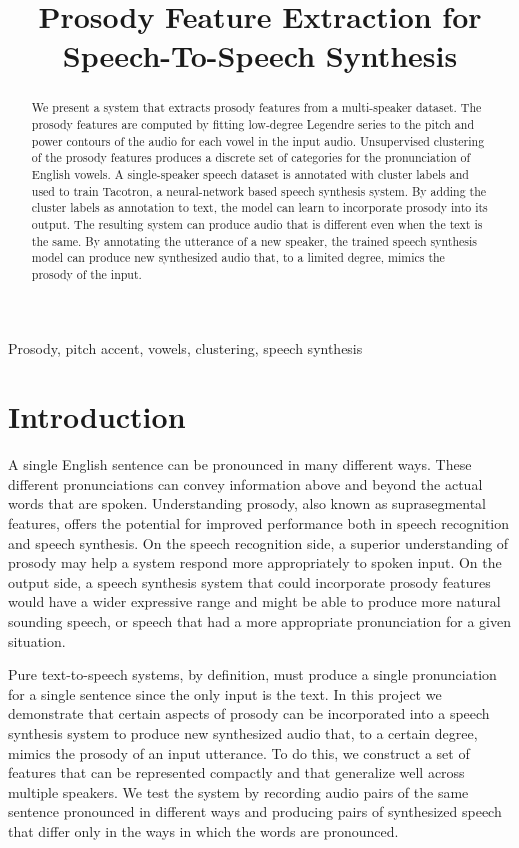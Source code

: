 \documentclass{article}
\title{Prosody Feature Extraction for Speech-To-Speech Synthesis}
\begin{document}
%
\maketitle
%
\begin{abstract}
We present a system that extracts prosody features from a multi-speaker dataset.
The prosody features are computed by fitting low-degree Legendre series to the pitch and power contours of the audio for each vowel in the input audio.
Unsupervised clustering of the prosody features produces a discrete set of categories for the pronunciation of English vowels. A single-speaker speech dataset is annotated with cluster labels and used to train Tacotron, a neural-network based speech synthesis system.
By adding the cluster labels as annotation to text, the model can learn to incorporate prosody into its output.
The resulting system can produce audio that is different even when the text is the same.
By annotating the utterance of a new speaker, the trained speech synthesis model can produce new synthesized audio that, to a limited degree, mimics the prosody of the input.
\end{abstract}
%
\begin{keywords}
Prosody, pitch accent, vowels, clustering, speech synthesis
\end{keywords}
%
\section{Introduction}
\label{sec:intro}

A single English sentence can be pronounced in many different ways.
These different pronunciations can convey information above and beyond the actual words that are spoken.
Understanding prosody, also known as suprasegmental features, offers the potential for improved performance both in speech recognition and speech synthesis.
On the speech recognition side, a superior understanding of prosody may help a system respond more appropriately to spoken input.
On the output side, a speech synthesis system that could incorporate prosody features would have a wider expressive range and might be able to produce more natural sounding speech, or speech that had a more appropriate pronunciation for a given situation.

Pure text-to-speech systems, by definition, must produce a single pronunciation for a single sentence since the only input is the text.
In this project we demonstrate that certain aspects of prosody can be incorporated into a speech synthesis system to produce new synthesized audio that, to a certain degree, mimics the prosody of an input utterance.
To do this, we construct a set of features that can be represented compactly and that generalize well across multiple speakers.
We test the system by recording audio pairs of the same sentence pronounced in different ways and producing pairs of synthesized speech that differ only in the ways in which the words are pronounced.
\end{document}
